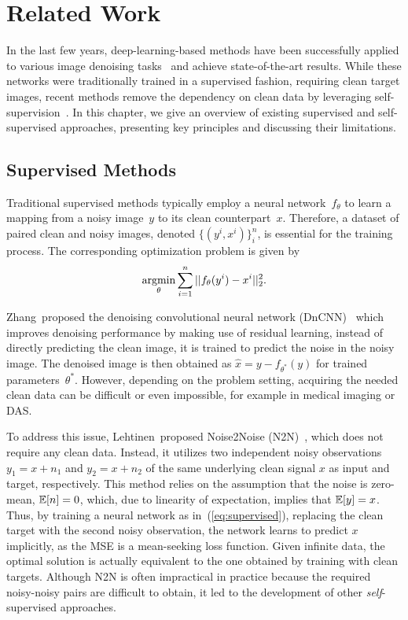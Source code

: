 \chapter{Related Work}\label{ch:related-work}

In the last few years, deep-learning-based methods have been successfully applied to various image denoising tasks~\cite{XXX} and achieve state-of-the-art results.
While these networks were traditionally trained in a supervised fashion, requiring clean target images, recent methods remove the dependency on clean data by leveraging self-supervision~\cite{SelfSupervisedDenoising}.
In this chapter, we give an overview of existing supervised and self-supervised approaches, presenting key principles and discussing their limitations.

\section{Supervised Methods}

Traditional supervised methods typically employ a neural network~$f_\theta$ to learn a mapping from a noisy image~$y$ to its clean counterpart~$x$.
Therefore, a dataset of paired clean and noisy images, denoted $\{(y^i,x^i)\}_i^n$, is essential for the training process.
The corresponding optimization problem is given by
\begin{equation}\label{eq:supervised}
    \operatorname*{argmin}_\theta \sum_{i=1}^{n} ||f_\theta(y^i) - x^i||_2^2.
\end{equation}


Zhang~\etal proposed the denoising convolutional neural network (DnCNN)~\cite{DnCNN} which improves denoising performance by making use of residual learning, \ie instead of directly predicting the clean image, it is trained to predict the noise in the noisy image.
The denoised image is then obtained as $\hat{x} = y - f_{\theta^*}(y)$ for trained parameters~$\theta^*$.
However, depending on the problem setting, acquiring the needed clean data can be difficult or even impossible, for example in medical imaging or DAS.

To address this issue, Lehtinen~\etal proposed Noise2Noise (N2N)~\cite{N2N}, which does not require any clean data.
Instead, it utilizes two independent noisy observations $y_1 = x + n_1$ and $y_2 = x + n_2$ of the same underlying clean signal $x$ as input and target, respectively.
This method relies on the assumption that the noise is zero-mean, \ie $\mathbb{E} [n] = 0$, which, due to linearity of expectation, implies that $\mathbb{E} [y] = x$.
Thus, by training a neural network as in~(\ref{eq:supervised}), replacing the clean target with the second noisy observation, the network learns to predict $x$ implicitly, as the MSE is a mean-seeking loss function.
Given infinite data, the optimal solution is actually equivalent to the one obtained by training with clean targets.
Although N2N is often impractical in practice because the required noisy-noisy pairs are difficult to obtain, it led to the development of other \textit{self}-supervised approaches.

